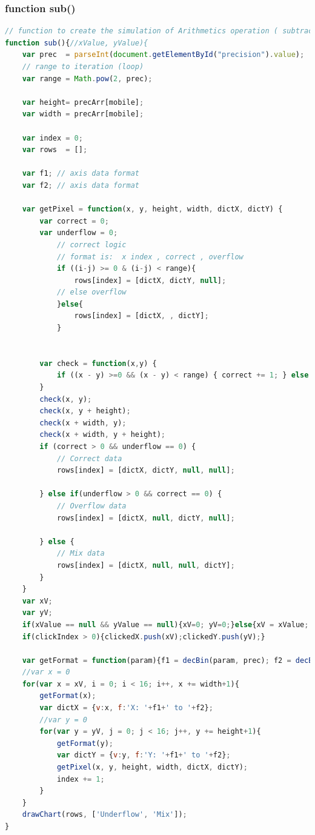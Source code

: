 \documentclass[11pt]{article}
\begin{document}
\subsubsection{function sub()}
\begin{lstlisting}[label={lst:sub}, language=Javascript, caption={sub function},]
// function to create the simulation of Arithmetics operation ( subtraction )
function sub(){//xValue, yValue){
	var prec  = parseInt(document.getElementById("precision").value);
	// range to iteration (loop)
	var range = Math.pow(2, prec);

	var height= precArr[mobile];
	var width = precArr[mobile];

	var index = 0;
	var rows  = [];

	var f1; // axis data format 
	var f2; // axis data format

	var getPixel = function(x, y, height, width, dictX, dictY) {
		var correct = 0;
		var underflow = 0;
			// correct logic
			// format is:  x index , correct , overflow
			if ((i-j) >= 0 & (i-j) < range){
				rows[index] = [dictX, dictY, null];
			// else overflow
			}else{
				rows[index] = [dictX, , dictY];
			}


		var check = function(x,y) {
			if ((x - y) >=0 && (x - y) < range) { correct += 1; } else { underflow += 1; }	
		}
		check(x, y);
		check(x, y + height);
		check(x + width, y);
		check(x + width, y + height);
		if (correct > 0 && underflow == 0) {
	    	// Correct data
			rows[index] = [dictX, dictY, null, null];

		} else if(underflow > 0 && correct == 0) {
			// Overflow data
			rows[index] = [dictX, null, dictY, null];

		} else {
			// Mix data
			rows[index] = [dictX, null, null, dictY];
		}
	}
	var xV;
	var yV; 
	if(xValue == null && yValue == null){xV=0; yV=0;}else{xV = xValue; yV = yValue;}
	if(clickIndex > 0){clickedX.push(xV);clickedY.push(yV);}
	
	var getFormat = function(param){f1 = decBin(param, prec); f2 = decBin(param+height, prec);}
	//var x = 0
	for(var x = xV, i = 0; i < 16; i++, x += width+1){
		getFormat(x);
		var dictX = {v:x, f:'X: '+f1+' to '+f2};
		//var y = 0
		for(var y = yV, j = 0; j < 16; j++, y += height+1){
			getFormat(y);
			var dictY = {v:y, f:'Y: '+f1+' to '+f2};
			getPixel(x, y, height, width, dictX, dictY);
			index += 1;
		}
	}
	drawChart(rows, ['Underflow', 'Mix']);
}
\end{lstlisting}
\end{document}

